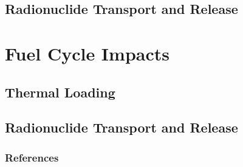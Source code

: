 \documentclass[9pt]{beamer}
\begin{document}
\subsection{Radionuclide Transport and Release}


\section{Fuel Cycle Impacts}
\subsection{}

\subsection{Thermal Loading}

\subsection{Radionuclide Transport and Release}




\begin{frame}[allowframebreaks]
  \frametitle{References}
  
  {\footnotesize  }

\end{frame}

\end{document}
